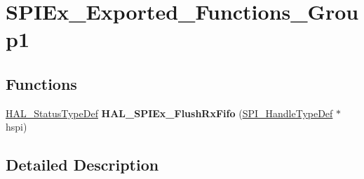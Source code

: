 \hypertarget{group___s_p_i_ex___exported___functions___group1}{}\section{S\+P\+I\+Ex\+\_\+\+Exported\+\_\+\+Functions\+\_\+\+Group1}
\label{group___s_p_i_ex___exported___functions___group1}
\subsection*{Functions}
\begin{DoxyCompactItemize}
\item 
\mbox{\label{group___s_p_i_ex___exported___functions___group1_ga4e633d926515bb05b8f6b6ce16ad1c1c}} 
\hyperlink{stm32f0xx__hal__def_8h_a63c0679d1cb8b8c684fbb0632743478f}{H\+A\+L\+\_\+\+Status\+Type\+Def} {\bfseries H\+A\+L\+\_\+\+S\+P\+I\+Ex\+\_\+\+Flush\+Rx\+Fifo} (\hyperlink{group___s_p_i___exported___types_gab3bd115785297692c125528b7293566b}{S\+P\+I\+\_\+\+Handle\+Type\+Def} $\ast$hspi)
\end{DoxyCompactItemize}


\subsection{Detailed Description}
